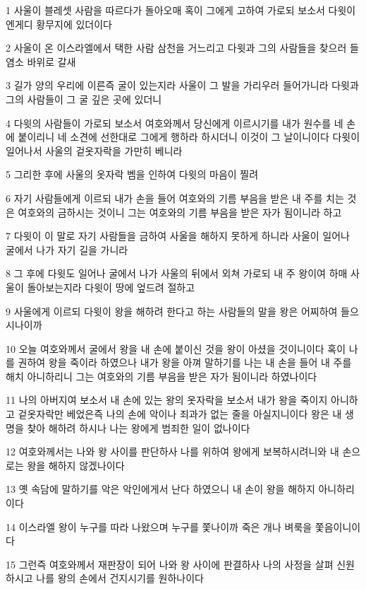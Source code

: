 \par 1 사울이 블레셋 사람을 따르다가 돌아오매 혹이 그에게 고하여 가로되 보소서 다윗이 엔게디 황무지에 있더이다
\par 2 사울이 온 이스라엘에서 택한 사람 삼천을 거느리고 다윗과 그의 사람들을 찾으러 들염소 바위로 갈새
\par 3 길가 양의 우리에 이른즉 굴이 있는지라 사울이 그 발을 가리우러 들어가니라 다윗과 그의 사람들이 그 굴 깊은 곳에 있더니
\par 4 다윗의 사람들이 가로되 보소서 여호와께서 당신에게 이르시기를 내가 원수를 네 손에 붙이리니 네 소견에 선한대로 그에게 행하라 하시더니 이것이 그 날이니이다 다윗이 일어나서 사울의 겉옷자락을 가만히 베니라
\par 5 그리한 후에 사울의 옷자락 벰을 인하여 다윗의 마음이 찔려
\par 6 자기 사람들에게 이르되 내가 손을 들어 여호와의 기름 부음을 받은 내 주를 치는 것은 여호와의 금하시는 것이니 그는 여호와의 기름 부음을 받은 자가 됨이니라 하고
\par 7 다윗이 이 말로 자기 사람들을 금하여 사울을 해하지 못하게 하니라 사울이 일어나 굴에서 나가 자기 길을 가니라
\par 8 그 후에 다윗도 일어나 굴에서 나가 사울의 뒤에서 외쳐 가로되 내 주 왕이여 하매 사울이 돌아보는지라 다윗이 땅에 엎드려 절하고
\par 9 사울에게 이르되 다윗이 왕을 해하려 한다고 하는 사람들의 말을 왕은 어찌하여 들으시나이까
\par 10 오늘 여호와께서 굴에서 왕을 내 손에 붙이신 것을 왕이 아셨을 것이니이다 혹이 나를 권하여 왕을 죽이라 하였으나 내가 왕을 아껴 말하기를 나는 내 손을 들어 내 주를 해치 아니하리니 그는 여호와의 기름 부음을 받은 자가 됨이니라 하였나이다
\par 11 나의 아버지여 보소서 내 손에 있는 왕의 옷자락을 보소서 내가 왕을 죽이지 아니하고 겉옷자락만 베었은즉 나의 손에 악이나 죄과가 없는 줄을 아실지니이다 왕은 내 생명을 찾아 해하려 하시나 나는 왕에게 범죄한 일이 없나이다
\par 12 여호와께서는 나와 왕 사이를 판단하사 나를 위하여 왕에게 보복하시려니와 내 손으로는 왕을 해하지 않겠나이다
\par 13 옛 속담에 말하기를 악은 악인에게서 난다 하였으니 내 손이 왕을 해하지 아니하리이다
\par 14 이스라엘 왕이 누구를 따라 나왔으며 누구를 쫓나이까 죽은 개나 벼룩을 쫓음이니이다
\par 15 그런즉 여호와께서 재판장이 되어 나와 왕 사이에 판결하사 나의 사정을 살펴 신원하시고 나를 왕의 손에서 건지시기를 원하나이다
